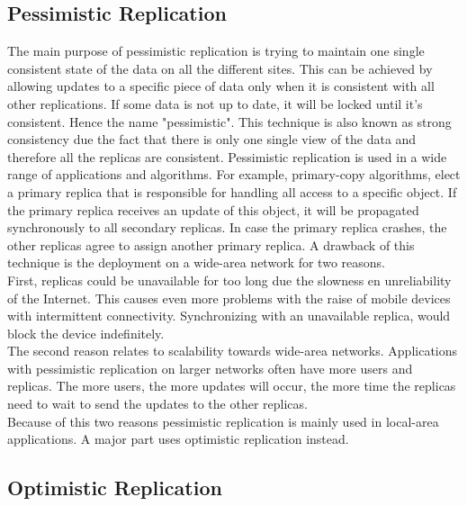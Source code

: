 \documentclass[a4paper,12pt]{report}
\begin{document}
\subsection{Pessimistic Replication}\label{sec:PessimisticReplication}

The main purpose of pessimistic replication is trying to maintain one single consistent state of the data on all the different sites. This can be achieved by allowing updates to a specific piece of data only when it is consistent with all other replications. If some data is not up to date, it will be locked until it's consistent. Hence the name "pessimistic". This technique is also known as strong consistency due the fact that there is only one single view of the data and therefore all the replicas are consistent. Pessimistic replication is used in a wide range of applications and algorithms. For example, primary-copy algorithms, elect a primary replica that is responsible for handling all access to a specific object. If the primary replica receives an update of this object, it will be propagated synchronously to all secondary replicas. In case the primary replica crashes, the other replicas agree to assign another primary replica. A drawback of this technique is the deployment on a wide-area network for two reasons. \\
\indent First, replicas could be unavailable for too long due the slowness en unreliability of the Internet. This causes even more problems with the raise of mobile devices with intermittent connectivity. Synchronizing with an unavailable replica, would block the device indefinitely. \\
\indent The second reason relates to scalability towards wide-area networks. Applications with pessimistic replication on larger networks often have more users and replicas. The more users, the more updates will occur, the more time the replicas need to wait to send the updates to the other replicas. \\
Because of this two reasons pessimistic replication is mainly used in local-area applications. A major part uses optimistic replication instead.

\subsection{Optimistic Replication}\label{sec:OptimisticReplication}
\end{document}
